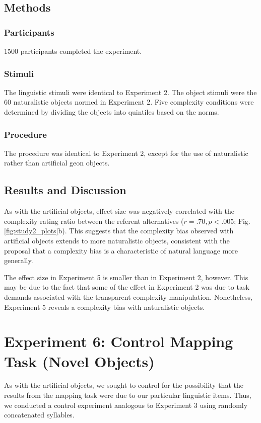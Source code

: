 \documentclass[man]{apa2}
\begin{document}
\subsection{Methods}
\subsubsection{Participants} 1500 participants completed the experiment.
\subsubsection{Stimuli} The linguistic stimuli were identical to Experiment 2. The object stimuli were the 60 naturalistic objects normed in Experiment 2. Five complexity conditions were determined by dividing the objects into quintiles based on the norms.

\subsubsection{Procedure} The procedure was identical to Experiment 2, except for the use of naturalistic rather than artificial geon objects. 

\subsection{Results and Discussion}
As with the artificial objects, effect size was negatively correlated with the complexity rating ratio between the referent alternatives ($r = .70, p < .005$; Fig. \ref{fig:study2_plots}b). This suggests that the complexity bias observed with artificial objects extends to more naturalistic objects, consistent with the proposal that a complexity bias is a characteristic of natural language more generally. 

The effect size in Experiment 5 is smaller than in Experiment 2, however. This may be due to the fact that some of the effect in Experiment 2 was due to task demands associated with the transparent complexity manipulation. Nonetheless, Experiment 5 reveals a complexity bias with naturalistic objects.

\section{Experiment 6: Control Mapping Task (Novel Objects)}
As with the artificial objects, we sought to control for the possibility that the results from the mapping task were due to our particular linguistic items. Thus, we conducted a control experiment analogous to Experiment 3 using randomly concatenated syllables.
\end{document}
